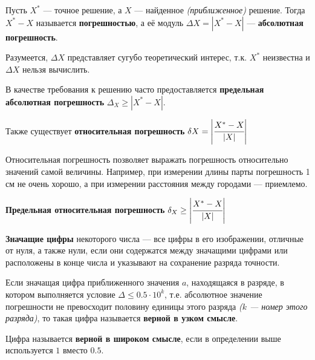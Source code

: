 \documentclass[12pt, a4paper, oneside]{book}
\begin{document}
\begin{definition}
    Пусть \(X^*\) --- точное решение, а \(X\) --- найденное \textit{(приближенное)} решение. Тогда \(X^* - X\) называется \textbf{погрешностью}, а её модуль \(\Delta X = |X^* - X|\) --- \textbf{абсолютная погрешность}.
\end{definition}

Разумеется, \(\Delta X\) представляет сугубо теоретический интерес, т.к. \(X^*\) неизвестна и \(\Delta X\) нельзя вычислить.

\begin{definition}
    В качестве требования к решению часто предоставляется \textbf{предельная абсолютная погрешность} \(\Delta_X \geq |X^* - X|\).
\end{definition}

\begin{definition}
    Также существует \textbf{относительная погрешность} \(\delta X = \left|\cfrac{X^* - X}{|X|}\right|\)
\end{definition}

Относительная погрешность позволяет выражать погрешность относительно значений самой величины. Например, при измерении длины парты погрешность 1 см не очень хорошо, а при измерении расстояния между городами --- приемлемо.

\begin{definition}
    \textbf{Предельная относительная погрешность} \(\delta_X \geq \left|\cfrac{X^* - X}{|X|}\right|\)
\end{definition}

\begin{definition}
    \textbf{Значащие цифры} некоторого числа --- все цифры в его изображении, отличные от нуля, а также нули, если они содержатся между значащими цифрами или расположены в конце числа и указывают на сохранение разряда точности.
\end{definition}

\begin{definition}
    Если значащая цифра приближенного значения \(a\), находящаяся в разряде, в котором выполняется условие \(\Delta \leq 0.5 \cdot 10^k\), т.е. абсолютное значение погрешности не превосходит половину единицы этого разряда \textit{(\(k\) --- номер этого разряда)}, то такая цифра называется \textbf{верной в узком смысле}.

    Цифра называется \textbf{верной в широком смысле}, если в определении выше используется \(1\) вместо \(0.5\).
\end{definition}
\end{document}
